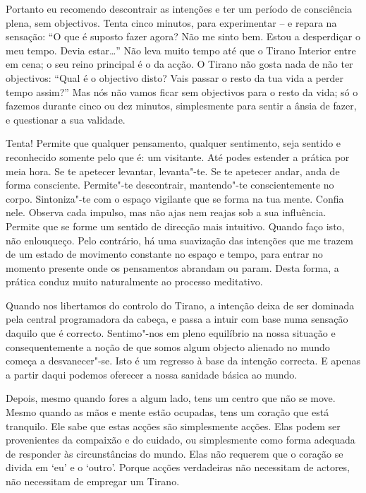 Portanto eu recomendo descontrair as intenções e ter um período de
consciência plena, sem objectivos. Tenta cinco minutos, para experimentar
-- e repara na sensação: “O que é suposto fazer agora? Não me sinto bem.
Estou a desperdiçar o meu tempo. Devia estar\ldots{}” Não leva muito tempo
até que o Tirano Interior entre em cena; o seu reino principal é o da
acção. O Tirano não gosta nada de não ter objectivos: “Qual é o objectivo
disto? Vais passar o resto da tua vida a perder tempo assim?” Mas nós
não vamos ficar sem objectivos para o resto da vida; só o fazemos durante
cinco ou dez minutos, simplesmente para sentir a ânsia de fazer, e
questionar a sua validade.

\enlargethispage*{\baselineskip}

Tenta! Permite que qualquer pensamento, qualquer sentimento, seja
sentido e reconhecido somente pelo que é: um visitante. Até podes
estender a prática por meia hora. Se te apetecer levantar, levanta"-te.
Se te apetecer andar, anda de forma consciente. Permite"-te descontrair,
mantendo"-te conscientemente no corpo. Sintoniza"-te com o espaço
vigilante que se forma na tua mente. Confia nele. Observa cada impulso,
mas não ajas nem reajas sob a sua influência. Permite que se forme um
sentido de direcção mais intuitivo. Quando faço isto, não enlouqueço.
Pelo contrário, há uma suavização das intenções que me trazem de um
estado de movimento constante no espaço e tempo, para entrar no momento
presente onde os pensamentos abrandam ou param. Desta forma, a prática
conduz muito naturalmente ao processo meditativo.

\sectionBreak

\enlargethispage*{\baselineskip}

Quando nos libertamos do controlo do Tirano, a intenção deixa de ser
dominada pela central programadora da cabeça, e passa a intuir com base
numa sensação daquilo que é correcto. Sentimo"-nos em pleno equilíbrio na
nossa situação e consequentemente a noção de que somos algum objecto
alienado no mundo começa a desvanecer"-se. Isto é um regresso à base da
intenção correcta. E apenas a partir daqui podemos oferecer a nossa
sanidade básica ao mundo.

Depois, mesmo quando fores a algum lado, tens um centro que não se move.
Mesmo quando as mãos e mente estão ocupadas, tens um coração que está
tranquilo. Ele sabe que estas acções são simplesmente acções. Elas podem
ser provenientes da compaixão e do cuidado, ou simplesmente como forma
adequada de responder às circunstâncias do mundo. Elas não requerem que
o coração se divida em `eu' e o `outro'. Porque acções verdadeiras não
necessitam de actores, não necessitam de empregar um Tirano.
